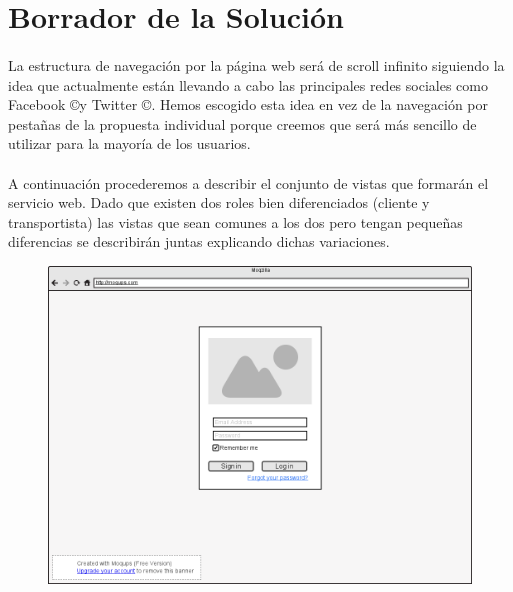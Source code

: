 \documentclass[10pt, a4paper,spanish]{article}
\begin{document}
		\section{Borrador de la Solución}

			\paragraph{}
			La estructura de navegación por la página web será de scroll infinito siguiendo la idea que actualmente están llevando a cabo las principales redes sociales como Facebook \copyright y  Twitter \copyright. Hemos escogido esta idea en vez de la navegación por pestañas de la propuesta individual porque creemos que será más sencillo de utilizar para la mayoría de los usuarios.

			\paragraph{}
			A continuación procederemos a describir el conjunto de vistas que formarán el servicio web. Dado que existen dos roles bien diferenciados (cliente y transportista) las vistas que sean comunes a los dos pero tengan pequeñas diferencias se describirán juntas explicando dichas variaciones.

			\begin{figure}[H]
				\centering
				\begin{minipage}[b]{0.8\textwidth}
					\includegraphics[width=\textwidth]{res/Login.png}
				\end{minipage}
			\end{figure}
\end{document}
